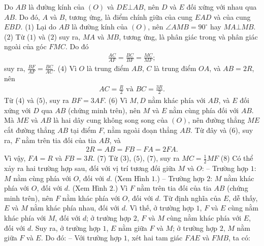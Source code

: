 \begin{multicols}{2}
\begin{figure}[H]
		\vspace*{-10pt}
	\end{figure}                                                                    
	Do $AB$ là đường kính của $(O)$ và $DE \bot AB$, nên $D$ và $E$ đối xứng với nhau qua $AB$. Do đó, $A$ và $B$, tương ứng, là điểm chính giữa của cung $EAD$ và của cung $EBD$. \hfill ($1$)
	\vskip 0.05cm
	Lại do $AB$ là đường kính của $(O)$, nên $\angle AMB = 90^\circ$  hay $MA \bot MB.$   \hfill ($2$)
	\vskip 0.05cm
	Từ ($1$) và ($2$) suy ra, $MA$ và $MB$, tương ứng, là phân giác trong và phân giác ngoài của góc $FMC$. Do đó
	\begin{align*}
		\frac{{AC}}{{AF}} = \frac{{BC}}{{BF}} = \frac{{MC}}{{MF}}; \tag{$3$}
	\end{align*}
	suy ra, $\frac{{BF}}{{AF}} = \frac{{BC}}{{AC}}.$ \hfill ($4$)
	\vskip 0.05cm
	Vì $O$ là trung điểm $AB$, $C$ là trung điểm $OA$, và $AB = 2R$, nên
	\begin{align*}
		AC = \frac{R}{2} \text{ và } BC = \frac{3R}{2}. \tag{$5$}
	\end{align*}
	Từ ($4$) và ($5$), suy ra $BF = 3AF$. \hfill ($6$)
	\vskip 0.05cm
	Vì $M, D$ nằm khác phía với $AB$, và $E$ đối xứng với $D$ qua $AB$ (chứng minh trên), nên $M$ và $E$ nằm cùng phía đối với $AB$. Mà $ME$ và $AB$ là hai dây cung không song song của $(O)$, nên đường thẳng $ME$ cắt đường thẳng $AB$ tại điểm $F$, nằm ngoài đoạn thẳng $AB$. Từ đây và ($6$), suy ra, $F$ nằm trên tia đối của tia $AB$, và
	\begin{align*}
		2R = AB = FB - FA = 2FA.
	\end{align*}
	Vì vậy, $FA = R$ và $FB = 3R$. \hfill ($7$)
	\vskip 0.05cm
	Từ ($3$), ($5$), ($7$), suy ra  $MC = \frac{1}{2}MF$ \hfill ($8$)
	\vskip 0.05cm
	Có thể xảy ra hai trường hợp sau, đối với vị trí tương đối giữa $M$ và $O$:
	\vskip 0.05cm
	-- Trường hợp $1$: $M$ nằm cùng phía với $O$, đối với $d$. (Xem Hình $1$.)
	\vskip 0.05cm
	-- Trường hợp $2$: $M$ nằm khác phía với $O$, đối với $d$. (Xem Hình $2$.)
	\vskip 0.05cm
	Vì $F$ nằm trên tia đối của tia $AB$ (chứng minh trên), nên $F$ nằm khác phía với $O$, đối với $d$.
	\vskip 0.05cm
	Từ định nghĩa của $E$, dễ thấy, $E$ và $M$ nằm khác phía nhau, đối với $d$.
	\vskip 0.05cm
	Vì thế, ở trường hợp $1$, $F$ và $E$ cùng nằm khác phía với $M$, đối với $d$; ở trường hợp $2$, $F$ và $M$ cùng nằm khác phía với $E$, đối với $d$.
	\vskip 0.05cm
	Suy ra, ở trường hợp $1$, $E$ nằm giữa $F$ và $M$; ở trường hợp $2$, $M$ nằm giữa $F$ và $E$.
	\vskip 0.05cm
	Do đó:
	\vskip 0.05cm
	-- Với trường hợp $1$, xét hai tam giác $FAE$ và $FMB$, ta có:

\end{multicols}
